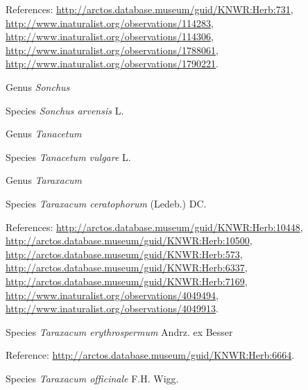 \documentclass[9pt, article]{memoir}
\begin{document}
\begin{multicols}{2}
\vspace{6pt}References: 
\url{http://arctos.database.museum/guid/KNWR:Herb:731}, 
\url{http://www.inaturalist.org/observations/114283}, 
\url{http://www.inaturalist.org/observations/114306}, 
\url{http://www.inaturalist.org/observations/1788061}, 
\url{http://www.inaturalist.org/observations/1790221}.

\vspace{6pt}\noindent\hspace{30pt}Genus \textit{Sonchus}


\vspace{6pt}\noindent\hspace{36pt}Species \textit{Sonchus arvensis} L.


\vspace{6pt}\noindent\hspace{30pt}Genus \textit{Tanacetum}


\vspace{6pt}\noindent\hspace{36pt}Species \textit{Tanacetum vulgare} L.


\vspace{6pt}\noindent\hspace{30pt}Genus \textit{Taraxacum}


\vspace{6pt}\noindent\hspace{36pt}Species \textit{Taraxacum ceratophorum} (Ledeb.) DC.


\vspace{6pt}References: 
\url{http://arctos.database.museum/guid/KNWR:Herb:10448}, 
\url{http://arctos.database.museum/guid/KNWR:Herb:10500}, 
\url{http://arctos.database.museum/guid/KNWR:Herb:573}, 
\url{http://arctos.database.museum/guid/KNWR:Herb:6337}, 
\url{http://arctos.database.museum/guid/KNWR:Herb:7169}, 
\url{http://www.inaturalist.org/observations/4049494}, 
\url{http://www.inaturalist.org/observations/4049913}.

\vspace{6pt}\noindent\hspace{36pt}Species \textit{Taraxacum erythrospermum} Andrz. ex Besser


\vspace{6pt}Reference: 
\url{http://arctos.database.museum/guid/KNWR:Herb:6664}.

\vspace{6pt}\noindent\hspace{36pt}Species \textit{Taraxacum officinale} F.H. Wigg.



\end{multicols}
\end{document}
